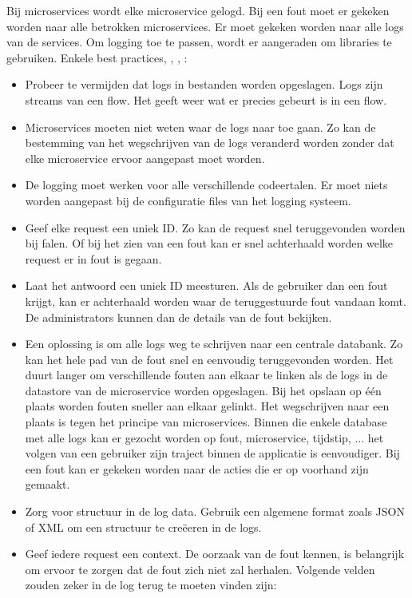 Bij microservices wordt elke microservice gelogd. Bij een fout moet er gekeken worden naar alle betrokken microservices. Er moet gekeken worden naar alle logs van de services. Om logging toe te passen, wordt er aangeraden om libraries te gebruiken. Enkele best practices, \textcite{Melendez2018}, \textcite{Eyee2018}, \textcite{Timms2018}:
\begin{itemize}
	\item Probeer te vermijden dat logs in bestanden worden opgeslagen. Logs zijn streams van een flow. Het geeft  weer wat er precies gebeurt is in een flow.
	\item Microservices moeten niet  weten waar de logs naar toe gaan. Zo kan de bestemming van het  wegschrijven van de logs veranderd worden zonder dat elke microservice ervoor aangepast moet worden.
	\item De logging moet werken voor alle verschillende codeertalen. Er moet niets worden aangepast bij de configuratie files van het logging systeem.
	\item Geef elke request een uniek ID. Zo kan de request snel teruggevonden worden bij falen. Of bij het zien van een fout kan er snel achterhaald worden  welke request er in fout is gegaan. 
	\item Laat het antwoord een uniek ID meesturen. Als de gebruiker dan een fout krijgt, kan er achterhaald worden waar de teruggestuurde fout vandaan komt. De administrators kunnen dan de details van de fout bekijken.
	\item Een oplossing is om alle logs  weg te schrijven naar een centrale databank. Zo kan het hele pad van de fout snel en eenvoudig teruggevonden worden. Het duurt langer om verschillende fouten aan elkaar te linken als de logs in de datastore van de microservice worden opgeslagen. Bij het opslaan op één plaats worden fouten sneller aan elkaar gelinkt. Het  wegschrijven naar een plaats is tegen het principe van microservices. Binnen die enkele database met alle logs kan er gezocht worden op fout, microservice, tijdstip, ...  het volgen van een gebruiker zijn traject binnen de applicatie is eenvoudiger. Bij een fout kan er gekeken worden naar de acties die er op voorhand zijn gemaakt. 
	\item Zorg voor structuur in de log data. Gebruik een algemene format zoals JSON of XML om een structuur te creëeren in de logs. 
	\item Geef iedere request een context.  De oorzaak van de fout kennen, is belangrijk om ervoor te zorgen dat de fout zich niet zal herhalen. Volgende velden zouden zeker in de log terug te moeten vinden zijn:

\end{itemize}
